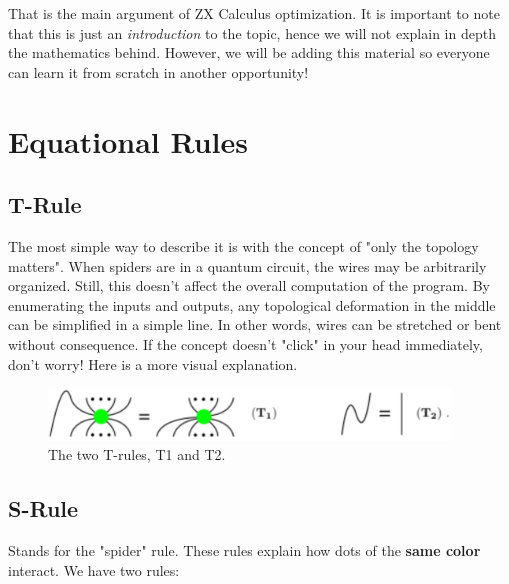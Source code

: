 That is the main argument of ZX Calculus optimization. It is important to note that this is just an \textit{introduction} to the topic, hence we will not explain in depth the mathematics behind. However, we will be adding this material so everyone can learn it from scratch in another opportunity!

\section{Equational Rules}
\subsection{T-Rule}
The most simple way to describe it is with the concept of "only the topology matters". When spiders are in a quantum circuit, the wires may be arbitrarily organized. Still, this doesn't affect the overall computation of the program. By enumerating the inputs and outputs, any topological deformation in the middle can be simplified in a simple line. In other words, wires can be stretched or bent without consequence. If the concept doesn't "click" in your head immediately, don't worry! Here is a more visual explanation.
\begin{figure}[H]
        \centering
        \includegraphics[width = 0.95\textwidth]{Figures/t.rule.ex.png}
        \caption{The two T-rules, T1 and T2.}
        \label{fig:t1-t2}
    \end{figure}

\begin{center}
\end{center}

\subsection{S-Rule}
Stands for the "spider" rule. These rules explain how dots of the \textbf{same color} interact. We have two rules:
